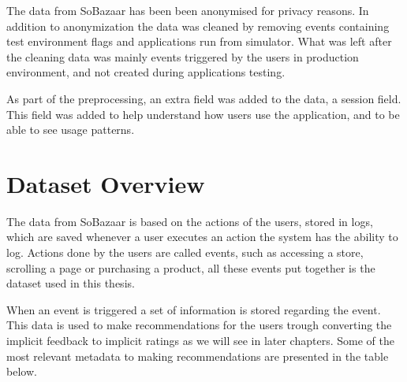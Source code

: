     The data from SoBazaar has been been anonymised for privacy reasons.
    In addition to anonymization the data was cleaned by removing events containing test environment flags and applications run from simulator.
    What was left after the cleaning data was mainly events triggered by the users in production environment, and not created during applications testing.

    As part of the preprocessing, an extra field was added to the data, a session field.
    This field was added to help understand how users use the application, and to be able to see usage patterns.

\section{Dataset Overview}
    The data from SoBazaar is based on the actions of the users, stored in logs, which are saved whenever a user executes an action the system has the ability to log.
    Actions done by the users are called events, such as accessing a store, scrolling a page or purchasing a product, all these events put together is the dataset used in this thesis.

    When an event is triggered a set of information is stored regarding the event.
    This data is used to make recommendations for the users trough converting the implicit feedback to implicit ratings as we will see in later chapters.
    Some of the most relevant metadata to making recommendations are presented in the table below.

